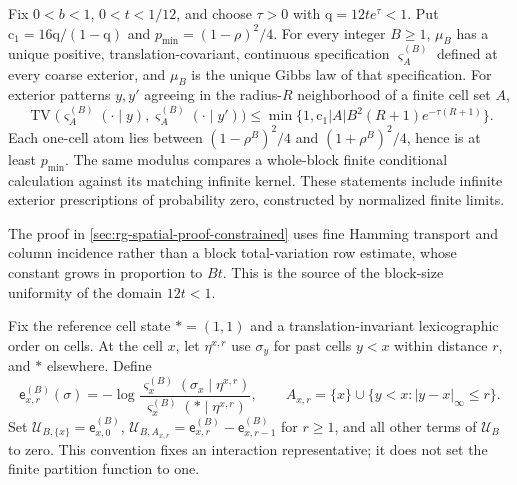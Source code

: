Fix \(0<b<1\), \(0<t<1/12\), and choose \(\tau>0\) with
\(\mathrm q=12te^\tau<1\). Put \(\mathrm c_1=16\mathrm q/(1-\mathrm q)\) and
\(p_{\min}=(1-\rho)^2/4\). For every integer \(B\ge1\), \(\mu_B\) has a
unique positive, translation-covariant, continuous specification
\(\varsigma^{(B)}_A\) defined at every coarse exterior, and \(\mu_B\) is the
unique Gibbs law of that specification. For exterior patterns \(y,y'\)
agreeing in the radius-\(R\) neighborhood of a finite cell set \(A\),
\begin{equation}
 \operatorname{TV}\bigl(\varsigma_A^{(B)}(\cdot\mid y),
                       \varsigma_A^{(B)}(\cdot\mid y')\bigr)
 \le\min\{1,\mathrm c_1|A|B^2(R+1)e^{-\tau(R+1)}\}.
 \label{eq:rg-spatial-coarse-modulus}
\end{equation}
Each one-cell atom lies between \((1-\rho^B)^2/4\) and
\((1+\rho^B)^2/4\), hence is at least \(p_{\min}\). The same modulus
compares a whole-block finite conditional calculation against its matching
infinite kernel. These statements include infinite exterior prescriptions
of probability zero, constructed by normalized finite limits.

The proof in \cref{sec:rg-spatial-proof-constrained} uses fine Hamming
transport and column incidence rather than a block total-variation row
estimate, whose constant grows in proportion to \(Bt\). This is the source
of the block-size uniformity of the domain \(12t<1\).

Fix the reference cell state \(*=(1,1)\) and a translation-invariant
lexicographic order on cells. At the cell \(x\), let \(\eta^{x,r}\) use
\(\sigma_y\) for past cells \(y<x\) within distance \(r\), and \(*\)
elsewhere. Define
\begin{equation}
 \mathsf e_{x,r}^{(B)}(\sigma)=-\log
 \frac{\varsigma_x^{(B)}(\sigma_x\mid\eta^{x,r})}
      {\varsigma_x^{(B)}(*\mid\eta^{x,r})},\qquad
 A_{x,r}=\{x\}\cup\{y<x:|y-x|_\infty\le r\}.
 \label{eq:rg-spatial-vacuum-odds}
\end{equation}
Set \(\mathscr U_{B,\{x\}}=\mathsf e_{x,0}^{(B)}\),
\(\mathscr U_{B,A_{x,r}}=\mathsf e_{x,r}^{(B)}-\mathsf e_{x,r-1}^{(B)}\) for
\(r\ge1\), and all other terms of \(\mathscr U_B\) to zero. This convention fixes
an interaction representative; it does not set the finite partition
function to one.

